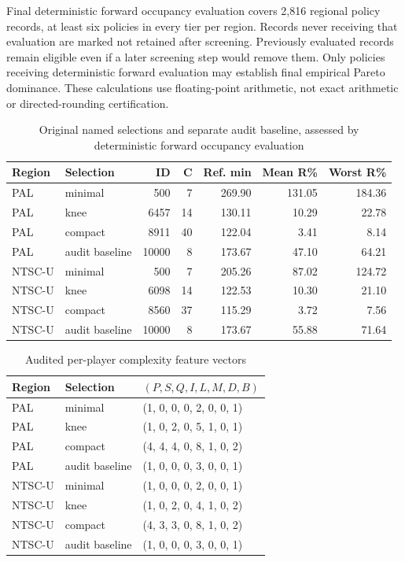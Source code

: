 \documentclass[11pt]{article}
\theoremstyle{definition}\newtheorem{definition}[theorem]{Definition}
\begin{document}
Final deterministic forward occupancy evaluation covers 2,816 regional policy records, at least six policies in every tier per region. Records never receiving that evaluation are marked not retained after screening. Previously evaluated records remain eligible even if a later screening step would remove them. Only policies receiving deterministic forward evaluation may establish final empirical Pareto dominance. These calculations use floating-point arithmetic, not exact arithmetic or directed-rounding certification.
\begin{table}[H]\centering\small
\begin{tabular}{llrrrrr}\toprule
Region & Selection & ID & C & Ref. min & Mean R\% & Worst R\%\\\midrule
PAL & minimal & 500 & 7 & 269.90 & 131.05 & 184.36\\
PAL & knee & 6457 & 14 & 130.11 & 10.29 & 22.78\\
PAL & compact & 8911 & 40 & 122.04 & 3.41 & 8.14\\
PAL & audit baseline & 10000 & 8 & 173.67 & 47.10 & 64.21\\
NTSC-U & minimal & 500 & 7 & 205.26 & 87.02 & 124.72\\
NTSC-U & knee & 6098 & 14 & 122.53 & 10.30 & 21.10\\
NTSC-U & compact & 8560 & 37 & 115.29 & 3.72 & 7.56\\
NTSC-U & audit baseline & 10000 & 8 & 173.67 & 55.88 & 71.64\\
\bottomrule\end{tabular}
\caption{Original named selections and separate audit baseline, assessed by deterministic forward occupancy evaluation}\label{tab:result-4}\end{table}
\begin{table}[H]\centering\small
\begin{tabular}{lll}\toprule
Region & Selection & $(P,S,Q,I,L,M,D,B)$\\\midrule
PAL & minimal & (1, 0, 0, 0, 2, 0, 0, 1)\\
PAL & knee & (1, 0, 2, 0, 5, 1, 0, 1)\\
PAL & compact & (4, 4, 4, 0, 8, 1, 0, 2)\\
PAL & audit baseline & (1, 0, 0, 0, 3, 0, 0, 1)\\
NTSC-U & minimal & (1, 0, 0, 0, 2, 0, 0, 1)\\
NTSC-U & knee & (1, 0, 2, 0, 4, 1, 0, 2)\\
NTSC-U & compact & (4, 3, 3, 0, 8, 1, 0, 2)\\
NTSC-U & audit baseline & (1, 0, 0, 0, 3, 0, 0, 1)\\
\bottomrule\end{tabular}
\caption{Audited per-player complexity feature vectors}\label{tab:result-5}\end{table}
\end{document}
